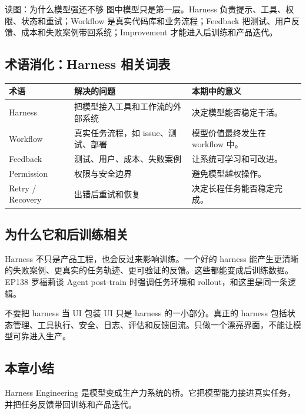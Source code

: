 \documentclass[a4paper]{article}
\begin{document}
\begin{knowledgebox}{读图：为什么模型强还不够}
图中模型只是第一层。Harness 负责提示、工具、权限、状态和重试；Workflow 是真实代码库和业务流程；Feedback 把测试、用户反馈、成本和失败案例带回系统；Improvement 才能进入后训练和产品迭代。
\end{knowledgebox}

\subsection{术语消化：Harness 相关词表}

\noindent\begin{tabularx}{\textwidth}{p{}p{}X}
\toprule
术语 & 解决的问题 & 本期中的意义 \\
\midrule
Harness & 把模型接入工具和工作流的外部系统 & 决定模型能否稳定干活。 \\
Workflow & 真实任务流程，如 issue、测试、部署 & 模型价值最终发生在 workflow 中。 \\
Feedback & 测试、用户、成本、失败案例 & 让系统可学习和可改进。 \\
Permission & 权限与安全边界 & 避免模型越权操作。 \\
Retry / Recovery & 出错后重试和恢复 & 决定长程任务能否稳定完成。 \\
\bottomrule
\end{tabularx}

\subsection{为什么它和后训练相关}

Harness 不只是产品工程，也会反过来影响训练。一个好的 harness 能产生更清晰的失败案例、更真实的任务轨迹、更可验证的反馈。这些都能变成后训练数据。EP138 罗福莉谈 Agent post-train 时强调任务环境和 rollout，和这里是同一条逻辑。

\begin{warningbox}{不要把 harness 当 UI 包装}
UI 只是 harness 的一小部分。真正的 harness 包括状态管理、工具执行、安全、日志、评估和反馈回流。只做一个漂亮界面，不能让模型可靠进入生产。
\end{warningbox}

\subsection{本章小结}

Harness Engineering 是模型变成生产力系统的桥。它把模型能力接进真实任务，并把任务反馈带回训练和产品迭代。
\end{document}
